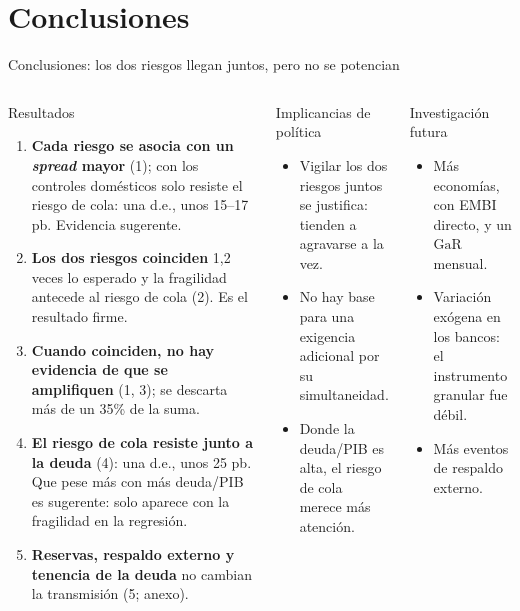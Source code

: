 \documentclass[aspectratio=169]{beamer}
\newcommand{\GaR}{\mathrm{GaR}}
\begin{document}
\section{Conclusiones}
\begin{frame}{Conclusiones: los dos riesgos llegan juntos, pero no se potencian}
\begin{columns}[T]
\begin{block}{Resultados}
\scriptsize
\begin{enumerate}\setlength\itemsep{1pt}
\item \textbf{Cada riesgo se asocia con un \textit{spread} mayor} (1); con los controles domésticos solo resiste el riesgo de cola: una d.e., unos 15--17 pb. Evidencia sugerente.
\item \textbf{Los dos riesgos coinciden} 1,2 veces lo esperado y la fragilidad antecede al riesgo de cola (2). Es el resultado firme.
\item \textbf{Cuando coinciden, no hay evidencia de que se amplifiquen} (1, 3); se descarta más de un 35\% de la suma.
\item \textbf{El riesgo de cola resiste junto a la deuda} (4): una d.e., unos 25 pb. Que pese más con más deuda/PIB es sugerente: solo aparece con la fragilidad en la regresión.
\item \textbf{Reservas, respaldo externo y tenencia de la deuda} no cambian la transmisión (5; anexo).
\end{enumerate}
\end{block}
\begin{exampleblock}{Implicancias de política}
\scriptsize
\begin{itemize}\setlength\itemsep{1pt}
\item Vigilar los dos riesgos juntos se justifica: tienden a agravarse a la vez.
\item No hay base para una exigencia adicional por su simultaneidad.
\item Donde la deuda/PIB es alta, el riesgo de cola merece más atención.
\end{itemize}
\end{exampleblock}
\begin{block}{Investigación futura}
\scriptsize
\begin{itemize}\setlength\itemsep{1pt}
\item Más economías, con EMBI directo, y un $\GaR$ mensual.
\item Variación exógena en los bancos: el instrumento granular fue débil.
\item Más eventos de respaldo externo.
\end{itemize}
\end{block}
\end{columns}
\end{frame}
\end{document}
